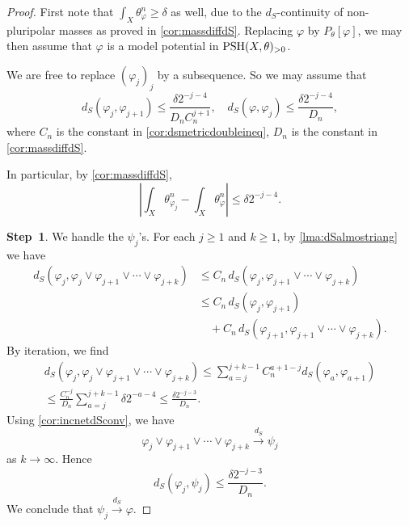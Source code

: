 \begin{proof}
    First note that $\int_X \theta_{\varphi}^n\geq \delta$ as well, due to the $d_S$-continuity of non-pluripolar masses as proved in \cref{cor:massdiffdS}. Replacing $\varphi$ by $P_{\theta}[\varphi]$, we may then assume that $\varphi$ is a model potential in $\mathrm{PSH}(X,\theta)_{>0}$.

    We are free to replace $(\varphi_j)_j$ by a subsequence. So we may assume that
    \begin{equation}\label{eq:conditiononvarphijtemp1}
    d_S(\varphi_j,\varphi_{j+1})\leq \frac{\delta 2^{-j-4}}{D_n C_n^{j+1}},\quad d_S(\varphi,\varphi_j)\leq \frac{\delta 2^{-j-4}}{D_n},
    \end{equation}
    where $C_n$ is the constant in \cref{cor:dsmetricdoubleineq}, $D_n$ is the constant in \cref{cor:massdiffdS}.

    In particular, by \cref{cor:massdiffdS},
    \begin{equation}\label{eq:varphijvarphimassdiffbdd}
        \left|\int_X \theta_{\varphi_j}^n-\int_X \theta_{\varphi}^n\right|\leq \delta 2^{-j-4}.
    \end{equation}

    \textbf{Step~1}. We handle the $\psi_j$'s. For each $j\geq 1$ and $k\geq 1$, by \cref{lma:dSalmostriang} we have
    \[
    \begin{aligned}
    d_S(\varphi_j,\varphi_j\lor\varphi_{j+1}\lor\cdots\lor \varphi_{j+k})
    &\leq C_n\,d_S(\varphi_j,\varphi_{j+1}\lor\cdots\lor \varphi_{j+k})\\
    &\leq C_n\,d_S(\varphi_j,\varphi_{j+1})\\
    &\quad + C_n\,d_S(\varphi_{j+1},\varphi_{j+1}\lor\cdots\lor \varphi_{j+k}).
    \end{aligned}
    \]
    By iteration, we find
    \[
    \begin{split}
        d_S(\varphi_j,\varphi_j\lor\varphi_{j+1}\lor\cdots\lor \varphi_{j+k})\leq \sum_{a=j}^{j+k-1}C_n^{a+1-j}d_S(\varphi_a,\varphi_{a+1})\\
        \leq \frac{C_n^{-j}}{D_n}\sum_{a=j}^{j+k-1}\delta 2^{-a-4}\leq \frac{\delta 2^{-j-3}}{D_n}.
    \end{split}
    \]
    Using \cref{cor:incnetdSconv}, we have
    \[
        \varphi_j\lor\varphi_{j+1}\lor\cdots\lor \varphi_{j+k}\xrightarrow{d_S}\psi_j
    \]
    as $k\to\infty$. Hence
    \begin{equation}\label{eq:dsvarphijpsijesttemp1}
        d_S(\varphi_j,\psi_j)\leq \frac{\delta 2^{-j-3}}{D_n}.
    \end{equation}
    We conclude that $\psi_j\xrightarrow{d_S}\varphi$.


\end{proof}
